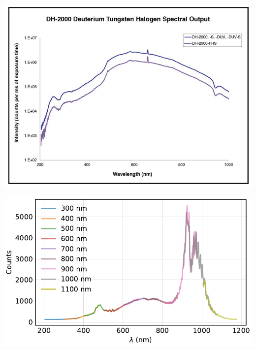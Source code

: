 \begin{frame}
	\centering
	\includegraphics[width=.8\textwidth]{./figures/dh-2000.png}
\end{frame}

\begin{frame}
	\centering
	\includegraphics{../analysis/figures/stich.pdf}
\end{frame}